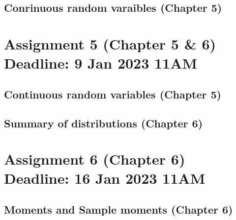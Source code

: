 \subsection{Conrinuous random varaibles (\textbf{Chapter 5})}
 


 

\section{Assignment 5 (Chapter 5 \& 6) \textbf{Deadline: 9 Jan 2023 11AM}}

\subsection{Continuous random variables (\textbf{Chapter 5})}
 
 
 
 
\newpage
\subsection{Summary of distributions (\textbf{Chapter 6}) }
 
 

\section{Assignment 6 (Chapter 6) \textbf{Deadline: 16 Jan 2023 11AM}}

\subsection{Moments and Sample moments (\textbf{Chapter 6})}
  

